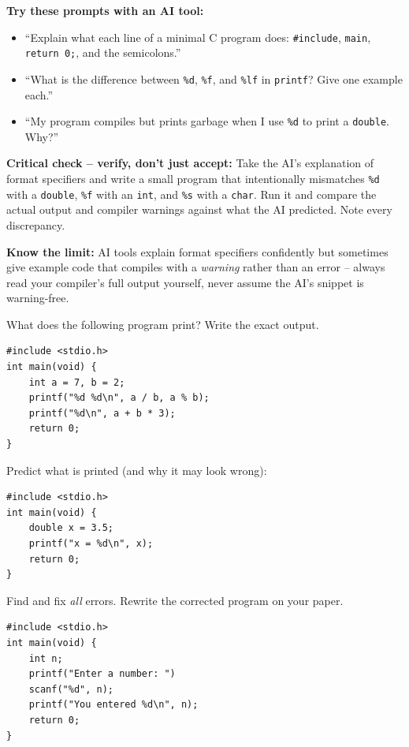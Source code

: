 \documentclass[11pt]{article}
\begin{document}
\begin{aicollab}
\textbf{Try these prompts with an AI tool:}
\begin{itemize}[leftmargin=*,nosep]
  \item ``Explain what each line of a minimal C program does:
        \texttt{\#include}, \texttt{main}, \texttt{return 0;}, and the semicolons.''
  \item ``What is the difference between \texttt{\%d}, \texttt{\%f}, and \texttt{\%lf} in
        \texttt{printf}? Give one example each.''
  \item ``My program compiles but prints garbage when I use \texttt{\%d} to print a
        \texttt{double}. Why?''
\end{itemize}

\medskip\textbf{Critical check -- verify, don't just accept:}
Take the AI's explanation of format specifiers and write a small program that
intentionally mismatches \texttt{\%d} with a \texttt{double}, \texttt{\%f} with an
\texttt{int}, and \texttt{\%s} with a \texttt{char}. Run it and compare the actual output
and compiler warnings against what the AI predicted. Note every discrepancy.

\medskip\textbf{Know the limit:}
AI tools explain format specifiers confidently but sometimes give example code that
compiles with a \emph{warning} rather than an error -- always read your compiler's full
output yourself, never assume the AI's snippet is warning-free.
\end{aicollab}

\takehomebanner

\begin{trace}
What does the following program print? Write the exact output.
\begin{lstlisting}
#include <stdio.h>
int main(void) {
    int a = 7, b = 2;
    printf("%d %d\n", a / b, a % b);
    printf("%d\n", a + b * 3);
    return 0;
}
\end{lstlisting}
\end{trace}

\begin{trace}
Predict what is printed (and why it may look wrong):
\begin{lstlisting}
#include <stdio.h>
int main(void) {
    double x = 3.5;
    printf("x = %d\n", x);
    return 0;
}
\end{lstlisting}
\end{trace}

\begin{bug}
Find and fix \emph{all} errors. Rewrite the corrected program on your paper.
\begin{lstlisting}
#include <stdio.h>
int main(void) {
    int n;
    printf("Enter a number: ")
    scanf("%d", n);
    printf("You entered %d\n", n);
    return 0;
}
\end{lstlisting}
\end{bug}
\end{document}
